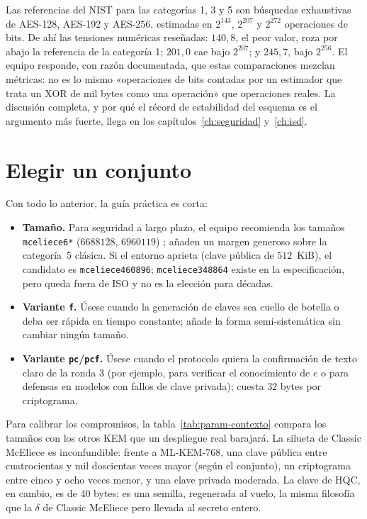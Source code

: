\documentclass[11pt,a4paper,oneside]{report}
\begin{document}
Las referencias del NIST para las categorías 1, 3 y 5 son búsquedas
exhaustivas de AES-128, AES-192 y AES-256, estimadas en $2^{143}$,
$2^{207}$ y $2^{272}$ operaciones de bits. De ahí las tensiones
numéricas reseñadas: $140{,}8$, el peor valor, roza por abajo la
referencia de la categoría 1; $201{,}0$ cae bajo $2^{207}$; y
$245{,}7$, bajo $2^{256}$. El equipo responde, con razón documentada,
que estas comparaciones mezclan métricas: no es lo mismo «operaciones
de bits contadas por un estimador que trata un XOR de mil bytes como
una operación» que operaciones reales. La discusión completa, y por
qué el récord de estabilidad del esquema es el argumento más fuerte,
llega en los capítulos~\ref{ch:seguridad} y~\ref{ch:isd}.

\section{Elegir un conjunto}\label{sec:param-elegir}

Con todo lo anterior, la guía práctica es corta:

\begin{itemize}[leftmargin=1.5em,itemsep=3pt]
  \item \textbf{Tamaño.} Para seguridad a largo plazo, el equipo
        recomienda los tamaños \texttt{mceliece6*}
        ($6688128$, $6960119$) \cite{cmiso}; añaden un margen
        generoso sobre la categoría~5 clásica. Si el entorno aprieta
        (clave pública de $512$~KiB), el candidato es
        \texttt{mceliece460896}; \texttt{mceliece348864} existe en la
        especificación, pero queda fuera de ISO y no es la elección
        para décadas.
  \item \textbf{Variante \texttt{f}.} Úsese cuando la generación de
        claves sea cuello de botella o deba ser rápida en tiempo
        constante; añade la forma semi-sistemática sin cambiar
        ningún tamaño.
  \item \textbf{Variante \texttt{pc}/\texttt{pcf}.} Úsese cuando el
        protocolo quiera la confirmación de texto claro de la ronda 3
        (por ejemplo, para verificar el conocimiento de $e$ o para
        defensas en modelos con fallos de clave privada); cuesta
        $32$ bytes por criptograma.
\end{itemize}

Para calibrar los compromisos, la tabla~\ref{tab:param-contexto}
compara los tamaños con los otros KEM que un despliegue real barajará.
La silueta de Classic McEliece es inconfundible: frente a ML-KEM-768,
una clave pública entre cuatrocientas y mil doscientas veces mayor
(según el conjunto), un criptograma entre cinco y ocho veces menor, y
una clave privada moderada. La clave de HQC, en
cambio, es de $40$ bytes: es una semilla, regenerada al vuelo, la
misma filosofía que la $\delta$ de Classic McEliece pero llevada al
secreto entero.
\end{document}
